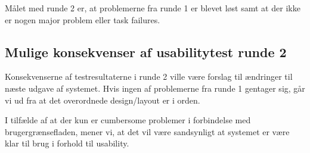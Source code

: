 Målet med runde 2 er, at problemerne fra runde 1 er blevet løst samt at der ikke er nogen major problem eller task failures.

\subsection{Mulige konsekvenser af usabilitytest runde 2}
\label{Usability_R2_cons}
Konsekvenserne af testresultaterne i runde 2 ville være forslag til ændringer til næste udgave af systemet. Hvis ingen af problemerne fra runde 1 gentager sig, går vi ud fra at det overordnede design/layout er i orden. 

I tilfælde af at der kun er cumbersome problemer i forbindelse med brugergrænsefladen, mener vi, at det vil være sandsynligt at systemet er være klar til brug i forhold til usability.